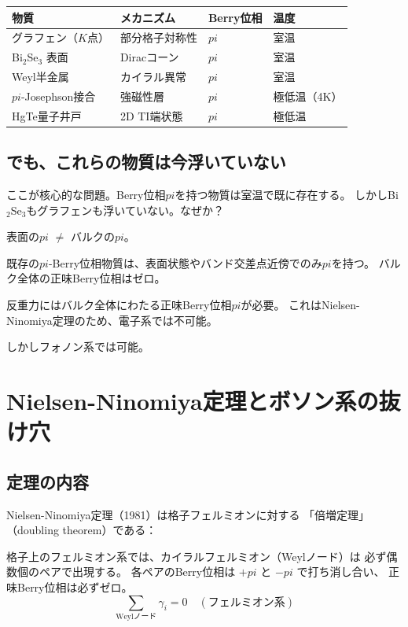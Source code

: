 \documentclass[11pt,a4paper]{article}
\def\pi{pi}%
\def\textbf#1{#1}%
\begin{document}
\begin{center}
\begin{tabular}{llll}
\toprule
物質 & メカニズム & Berry位相 & 温度 \\
\midrule
グラフェン（$K$点） & 部分格子対称性 & $\pi$ & 室温 \\
Bi$_2$Se$_3$ 表面 & Diracコーン & $\pi$ & 室温 \\
Weyl半金属 & カイラル異常 & $\pi$ & 室温 \\
$\pi$-Josephson接合 & 強磁性層 & $\pi$ & 極低温（4K） \\
HgTe量子井戸 & 2D TI端状態 & $\pi$ & 極低温 \\
\bottomrule
\end{tabular}
\end{center}

\subsection{でも、これらの物質は今浮いていない}

ここが核心的な問題。Berry位相$\pi$を持つ物質は室温で既に存在する。
しかしBi$_2$Se$_3$もグラフェンも浮いていない。なぜか？

\begin{tcolorbox}[colback=red!5,colframe=red!60!black,title=「浮いていない問題」の解決]
\textbf{表面の$\pi$ $\neq$ バルクの$\pi$。}

既存の$\pi$-Berry位相物質は、表面状態やバンド交差点\textbf{近傍}でのみ$\pi$を持つ。
バルク全体の正味Berry位相は\textbf{ゼロ}。

反重力には\textbf{バルク全体にわたる正味Berry位相$\pi$}が必要。
これはNielsen-Ninomiya定理のため、電子系では\textbf{不可能}。

しかしフォノン系では可能。
\end{tcolorbox}


\section{Nielsen-Ninomiya定理とボソン系の抜け穴}

\subsection{定理の内容}

Nielsen-Ninomiya定理（1981）は格子フェルミオンに対する
「倍増定理」（doubling theorem）である：

\begin{tcolorbox}[colback=blue!5,colframe=blue!60!black,title=Nielsen-Ninomiya定理]
格子上のフェルミオン系では、カイラルフェルミオン（Weylノード）は
必ず偶数個のペアで出現する。
各ペアのBerry位相は $+\pi$ と $-\pi$ で打ち消し合い、
正味Berry位相は必ずゼロ。
\begin{equation}
  \sum_{\text{Weylノード}} \gamma_i = 0 \quad (\text{フェルミオン系})
\end{equation}
\end{tcolorbox}
\end{document}
